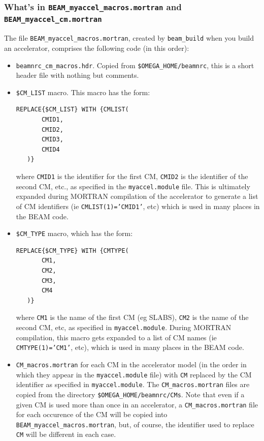 \documentclass[12pt,twoside]{article}
\begin{document}
\subsubsection{What's in {\tt BEAM\_myaccel\_macros.mortran} and
{\tt BEAM\_myaccel\_cm.mortran}}

The file {\tt BEAM\_myaccel\_macros.mortran}, created by {\tt beam\_build}
when you build an accelerator, comprises the following code (in this
order):
\begin{itemize}
\item {\tt beamnrc\_cm\_macros.hdr}.  Copied from {\tt \$OMEGA\_HOME/beamnrc},
this
is a short header file with nothing but comments.
\item {\tt \$CM\_LIST} macro.  This macro has the form:
\begin{verbatim}
REPLACE{$CM_LIST} WITH {CMLIST(
       CMID1,
       CMID2,
       CMID3,
       CMID4
   )}
\end{verbatim}
where {\tt CMID1} is the identifier for the first CM, {\tt CMID2} is the
identifier of the second CM, etc., as specified in the {\tt myaccel.module}
file.  This is ultimately expanded during MORTRAN compilation of the accelerator
to generate a list of CM identifiers (ie {\tt CMLIST(1)='CMID1'}, etc)
which is used in many places in the BEAM code.
\item {\tt \$CM\_TYPE} macro, which has the form:
\begin{verbatim}
REPLACE{$CM_TYPE} WITH {CMTYPE(
       CM1,
       CM2,
       CM3,
       CM4
   )}
\end{verbatim}
where {\tt CM1} is the name of the first CM (eg SLABS), {\tt CM2} is the
name of the second CM, etc, as specified in {\tt myaccel.module}.  During
MORTRAN compilation, this macro gets expanded to a list of CM names
(ie {\tt CMTYPE(1)='CM1'}, etc), which is used in many places in the BEAM
code.
\item {\tt CM\_macros.mortran} for each CM in the accelerator model
(in the order in which they appear in the {\tt myaccel.module} file) with
{\tt CM} replaced by the CM identifier as specified in {\tt myaccel.module}.
The {\tt CM\_macros.mortran} files
are copied from the directory {\tt \$OMEGA\_HOME/beamnrc/CMs}.  Note that
even if a given CM is used more than once in an accelerator, a
{\tt CM\_macros.mortran} file for each occurence of the CM will be
copied into {\tt BEAM\_myaccel\_macros.mortran}, but, of course, the
identifier used to replace {\tt CM} will be different in each case.
\end{itemize}
\end{document}
